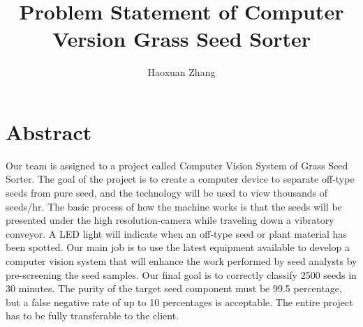 \documentclass[letter,draftclsnoffot, onecolumn]{IEEEtran}
\title{Problem Statement of Computer Version Grass Seed Sorter }
\author{Haoxuan Zhang }
\begin{document}
\maketitle

\section{Abstract}
Our team is assigned to a project called Computer Vision System of Grass Seed Sorter. The goal of the project is to create a computer device to separate off-type seeds from pure seed, and the technology will be used to view thousands of seeds/hr.  The basic process of how the machine works is that the seeds will be presented under the high resolution-camera while traveling down a vibratory conveyor. A LED light will indicate when an off-type seed or plant material has been spotted. Our main job is to use the latest equipment available to develop a computer vision system that will enhance the work performed by seed analysts by pre-screening the seed samples. Our final goal is to correctly classify 2500 seeds in 30 minutes. The purity of the target seed component must be 99.5 percentage, but a false negative rate of up to 10 percentages is acceptable. The entire project has to be fully transferable to the client.
\pagebreak
\end{document}
